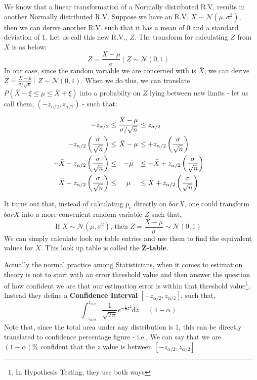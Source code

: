 We know that a linear transformation of a Normally distributed R.V. results in another Normally distributed R.V. Suppose we have an R.V. \(X \sim \mathcal{N}(\mu,\sigma^2)\), then we can derive another R.V.  such that it has a mean of \(0\) and a standard deviation of \(1\). Let us call this new R.V., \(Z\). The transform for calculating \(Z\) from \(X\) is as below:
	\[ Z = \frac{X-\mu}{\sigma} \mid Z \sim \mathcal{N}(0,1) \]
In our case, since the random variable we are concerned with is \(\bar{X}\), we can derive \( Z = \frac{X-\mu}{\sigma/\sqrt{n}} \mid Z \sim \mathcal{N}(0,1) \). When we do this, we can translate \( P(\bar{X}-\xi \leq \mu \leq \bar{X}+\xi) \) into a probabilty on \(Z\) lying between new limits - let us call them, \( (-z_{\alpha/2}, z_{\alpha/2}) \) - such that:
	\[\arraycolsep=1.4pt\def\arraystretch{2.2}
	\begin{array}{rcccl} 
	-z_{\alpha/2} & \leq & \dfrac{\bar{X}-\mu}{\sigma/\sqrt{n}} & \leq & z_{\alpha/2}\\ 
	-z_{\alpha/2}\left(\dfrac{\sigma}{\sqrt{n}}\right) & \leq & \bar{X}-\mu & \leq & +z_{\alpha/2}\left(\dfrac{\sigma}{\sqrt{n}}\right)\\ 
	-\bar{X}-z_{\alpha/2}\left(\dfrac{\sigma}{\sqrt{n}}\right) & \leq & -\mu & \leq & -\bar{X}+z_{\alpha/2}\left(\dfrac{\sigma}{\sqrt{n}}\right)\\ 
	\bar{X}-z_{\alpha/2}\left(\dfrac{\sigma}{\sqrt{n}}\right) & \leq & \mu &\leq & \bar{X}+z_{\alpha/2}\left(\dfrac{\sigma}{\sqrt{n}}\right) 
	\end{array}
	\]
	



It turns out that, instead of calculating \(p_v\) directly on \(bar{X}\), one could transform \(bar{X}\) into a more convenient random variable \(Z\) such that, 
	\[ \text{If } X \sim 	\mathcal{N}(\mu,\sigma^2) \text{, then } Z = \frac{X-\mu}{\sigma} \sim \mathcal{N}(0,1) \]
We can simply calculate look up table entries and use them to find the equivalent values for $X$. This look up table is called the \textbf{Z-table}.
 
Actually the normal practice among Statisticians, when it comes to estimation theory is not to start with an error threshold value and then answer the question of how confident we are that our estimation error is within that threshold value\footnote{In Hypothesis Testing, they use both ways}. Instead they define a \textbf{Confidence Interval}  \( [-z_{\alpha/2}, z_{\alpha/2}] \), such that,
	\[ \int_{-z_{\alpha/2}}^{z_{\alpha/2}}  \frac{1}{\sqrt{2\pi}} e^{-\frac{1}{2}z^2} \mathrm{d}z  = (1-\alpha)\]
Note that, since the total area under any distribution is 1, this can be directly translated to confidence percentage figure - i.e., We can say that we are \( (1-\alpha)\% \) confident that the $z$ value is between  \( [-z_{\alpha/2}, z_{\alpha/2}] \)

